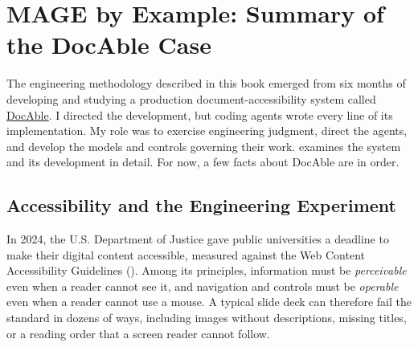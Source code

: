 


\chapter{MAGE by Example: Summary of the DocAble Case}


The engineering methodology described in this book emerged from six months of developing and studying a production document-accessibility system called \href{\%7B\%7Bproduct_url\%7D\%7D}{DocAble}. I directed the development, but coding agents wrote every line of its implementation. My role was to exercise engineering judgment, direct the agents, and develop the models and controls governing their work.  examines the system and its development in detail. For now, a few facts about DocAble are in order.

\section{Accessibility and the Engineering Experiment}\label{heading:accessibility-and-the-engineering-experiment}



In 2024, the U.S. Department of Justice gave public universities a deadline to make their digital content accessible, measured against the Web Content Accessibility Guidelines (). Among its principles, information must be \emph{perceivable} even when a reader cannot see it, and navigation and controls must be \emph{operable} even when a reader cannot use a mouse. A typical slide deck can therefore fail the standard in dozens of ways, including images without descriptions, missing titles, or a reading order that a screen reader cannot follow.

